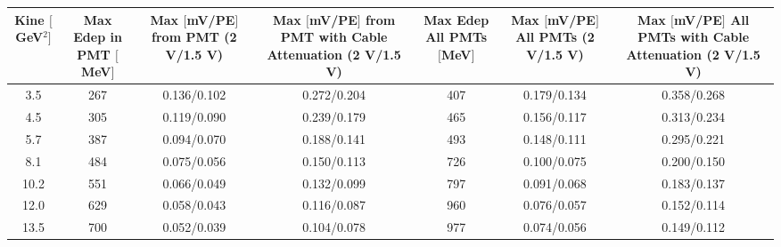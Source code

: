 \documentclass[10pt]{article}
\begin{document}
	\begin{table}[h]
	\centering
	\begin{tabular}{|c|cccccc|}
	\hline
	\makecell{Kine\\$[$GeV$^2]$} & \makecell{Max Edep\\in PMT\\$[$MeV$]$} & \makecell{Max $[$mV/PE$]$\\from PMT\\(2 V/1.5 V)} & \makecell{Max $[$mV/PE$]$\\from PMT\\with Cable\\Attenuation\\(2 V/1.5 V)} & \makecell{Max Edep\\All PMTs\\$[$MeV$]$} & \makecell{Max $[$mV/PE$]$\\All PMTs\\(2 V/1.5 V)} & \makecell{Max $[$mV/PE$]$\\All PMTs\\with Cable\\Attenuation\\(2 V/1.5 V)}\\
	\hline
	3.5 & 267 & 0.136/0.102 & 0.272/0.204 & 407 & 0.179/0.134 & 0.358/0.268\\
    4.5 & 305 & 0.119/0.090 & 0.239/0.179 & 465 & 0.156/0.117 & 0.313/0.234\\
    5.7 & 387 & 0.094/0.070 & 0.188/0.141 & 493 & 0.148/0.111 & 0.295/0.221\\
    8.1 & 484 & 0.075/0.056 & 0.150/0.113 & 726 & 0.100/0.075 & 0.200/0.150\\
    10.2 & 551 & 0.066/0.049 & 0.132/0.099 & 797 & 0.091/0.068 & 0.183/0.137\\
    12.0 & 629 & 0.058/0.043 & 0.116/0.087 & 960 & 0.076/0.057 & 0.152/0.114\\
    13.5 & 700 & 0.052/0.039 & 0.104/0.078 & 977 & 0.074/0.056 & 0.149/0.112\\

\end{tabular}
\end{table}
\end{document}
